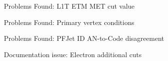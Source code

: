 \documentclass[8pt]{beamer}
\begin{document}
\begin{frame}{Problems Found: L1T ETM MET cut value}
 

\end{frame}

\begin{frame}{Problems Found: Primary vertex conditions}
 
\end{frame}

\begin{frame}{Problems Found: PFJet ID AN-to-Code disagreement}
 
\end{frame}

\begin{frame}{Documentation issue: Electron additional cuts}
 
\end{frame}
\end{document}

